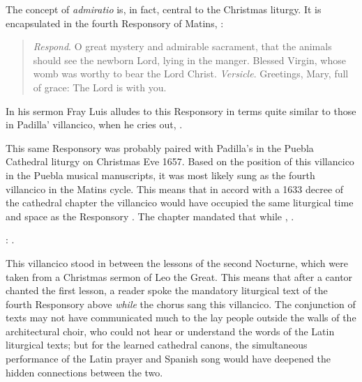 The concept of \emph{admiratio} is, in fact, central to the Christmas liturgy.
It is encapsulated in the fourth Responsory of Matins, :
\begin{quote}
    \emph{Respond}. O great mystery and admirable sacrament, that the animals
    should see the newborn Lord, lying in the manger.
    Blessed Virgin, whose womb was worthy to bear the Lord Christ.\newline
    \emph{Versicle}. Greetings, Mary, full of grace: The Lord is with you.%
        \Autocite 
        [175: .]
        {Catholic:Breviarium1631}
\end{quote}
In his sermon Fray Luis alludes to this Responsory in terms quite similar to
those in Padilla' villancico, when he cries out, .%
    \Autocite
    [38: ]
    {LuisdeGranada:Xmas}

This same Responsory was probably paired with Padilla's  in the Puebla Cathedral liturgy on Christmas Eve 1657.
Based on the position of this villancico in the Puebla musical manuscripts, it
was most likely sung as the fourth villancico in the Matins cycle.
This means that in accord with a 1633 decree of the cathedral chapter the
villancico would have occupied the same liturgical time and space as the
Responsory .
The chapter mandated that while , .%
\begin{Footnote}
    :
    .
\end{Footnote}
This villancico stood in between the lessons of the second Nocturne, which were
taken from a Christmas sermon of Leo the Great.
This means that after a cantor chanted the first lesson, a reader spoke the
mandatory liturgical text of the fourth Responsory above \emph{while} the chorus
sang this villancico.
The conjunction of texts may not have communicated much to the lay people
outside the walls of the architectural choir, who could not hear or understand
the words of the Latin liturgical texts; but for the learned cathedral canons,
the simultaneous performance of the Latin prayer and Spanish song would have
deepened the hidden connections between the two.

